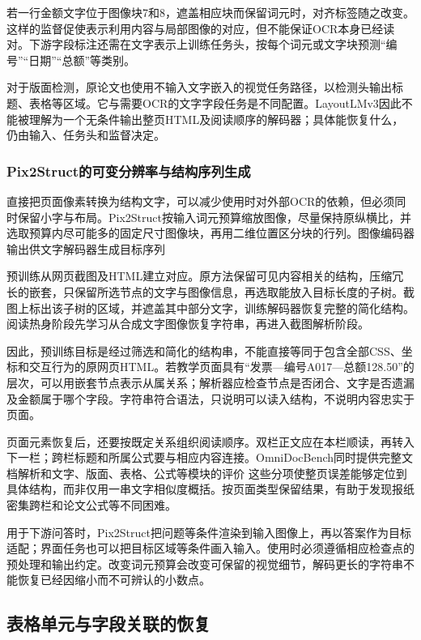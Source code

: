 若一行金额文字位于图像块7和8，遮盖相应块而保留词元时，对齐标签随之改变。这样的监督促使表示利用内容与局部图像的对应，但不能保证OCR本身已经读对。下游字段标注还需在文字表示上训练任务头，按每个词元或文字块预测“编号”“日期”“总额”等类别。

对于版面检测，原论文也使用不输入文字嵌入的视觉任务路径，以检测头输出标题、表格等区域。它与需要OCR的文字字段任务是不同配置。LayoutLMv3因此不能被理解为一个无条件输出整页HTML及阅读顺序的解码器；具体能恢复什么，仍由输入、任务头和监督决定。

\subsubsection{Pix2Struct的可变分辨率与结构序列生成}
\label{sec:vision-understanding-pix2struct}

直接把页面像素转换为结构文字，可以减少使用时对外部OCR的依赖，但必须同时保留小字与布局。Pix2Struct按输入词元预算缩放图像，尽量保持原纵横比，并选取预算内尽可能多的固定尺寸图像块，再用二维位置区分块的行列。图像编码器输出供文字解码器生成目标序列

预训练从网页截图及HTML建立对应。原方法保留可见内容相关的结构，压缩冗长的嵌套，只保留所选节点的文字与图像信息，再选取能放入目标长度的子树。截图上标出该子树的区域，并遮盖其中部分文字，训练解码器恢复完整的简化结构。阅读热身阶段先学习从合成文字图像恢复字符串，再进入截图解析阶段。

因此，预训练目标是经过筛选和简化的结构串，不能直接等同于包含全部CSS、坐标和交互行为的原网页HTML。若教学页面具有“发票—编号A017—总额128.50”的层次，可以用嵌套节点表示从属关系；解析器应检查节点是否闭合、文字是否遗漏及金额属于哪个字段。字符串符合语法，只说明可以读入结构，不说明内容忠实于页面。

页面元素恢复后，还要按既定关系组织阅读顺序。双栏正文应在本栏顺读，再转入下一栏；跨栏标题和所属公式要与相应内容连接。OmniDocBench同时提供完整文档解析和文字、版面、表格、公式等模块的评价
这些分项使整页误差能够定位到具体结构，而非仅用一串文字相似度概括。按页面类型保留结果，有助于发现报纸密集跨栏和论文公式等不同困难。

用于下游问答时，Pix2Struct把问题等条件渲染到输入图像上，再以答案作为目标适配；界面任务也可以把目标区域等条件画入输入。使用时必须遵循相应检查点的预处理和输出约定。改变词元预算会改变可保留的视觉细节，解码更长的字符串不能恢复已经因缩小而不可辨认的小数点。

\subsection{表格单元与字段关联的恢复}
\label{sec:vision-understanding-tables}

